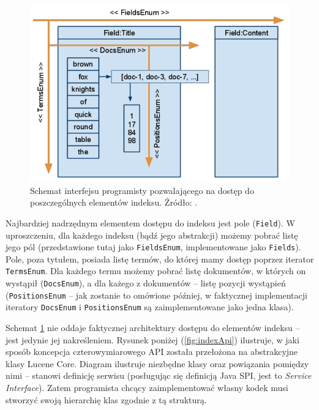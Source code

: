 \begin{figure}[here]
 \includegraphics[scale=0.5]{pictures/api.png}
 \caption{Schemat interfejsu programisty pozwalającego na dostęp do poszczególnych elementów indeksu. Źródło: \cite{flexindex}.\label{fig:4dimAPI}}
\end{figure}

Najbardziej nadrzędnym elementem dostępu do indeksu jest pole (\texttt{Field}). W uproszczeniu, dla każdego indeksu (bądź jego abstrakcji) możemy pobrać listę jego pól (przedstawione tutaj jako \texttt{FieldsEnum}, implementowane jako \texttt{Fields}). Pole, poza tytułem, posiada listę termów, do której mamy dostęp poprzez iterator \texttt{TermsEnum}. Dla każdego termu możemy pobrać listę dokumentów, w których on wystąpił (\texttt{DocsEnum}), a dla każego z dokumentów -- listę pozycji wystąpień (\texttt{PositionsEnum} -- jak zostanie to omówione później, w faktycznej implementacji iteratory \texttt{DocsEnum} i \texttt{PositionsEnum} są zaimplementowane jako jedna klasa).

Schemat \ref{fig:4dimAPI} nie oddaje faktycznej architektury dostępu do elementów indeksu -- jest jedynie jej nakreśleniem. Rysunek poniżej (\ref{fig:indexApi}) ilustruje, w jaki sposób koncepcja czterowymiarowego API została przełożona na abstrakcyjne klasy Lucene Core. Diagram ilustruje niezbędne klasy oraz powiązania pomiędzy nimi -- stanowi definicję serwisu (posługując się definicją Java SPI, jest to \emph{Service Interface}). Zatem programista chcący zaimplementować własny kodek musi stworzyć swoją hierarchię klas zgodnie z tą strukturą.

